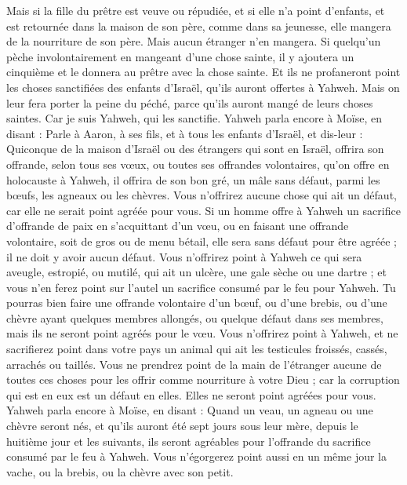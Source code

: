 \begin{multicols}{2}
Mais si la fille du prêtre est veuve ou répudiée, et si elle n'a point d'enfants, et est retournée dans la maison de son père, comme dans sa jeunesse, elle mangera de la nourriture de son père. Mais aucun étranger n'en mangera.
Si quelqu'un pèche involontairement en mangeant d'une chose sainte, il y ajoutera un cinquième et le donnera au prêtre avec la chose sainte.
Et ils ne profaneront point les choses sanctifiées des enfants d'Israël, qu'ils auront offertes à Yahweh.
Mais on leur fera porter la peine du péché, parce qu'ils auront mangé de leurs choses saintes. Car je suis Yahweh, qui les sanctifie.
Yahweh parla encore à Moïse, en disant :
Parle à Aaron, à ses fils, et à tous les enfants d'Israël, et dis-leur : Quiconque de la maison d'Israël ou des étrangers qui sont en Israël, offrira son offrande, selon tous ses vœux, ou toutes ses offrandes volontaires, qu'on offre en holocauste à Yahweh,
il offrira de son bon gré, un mâle sans défaut, parmi les bœufs, les agneaux ou les chèvres.
Vous n'offrirez aucune chose qui ait un défaut, car elle ne serait point agréée pour vous.
Si un homme offre à Yahweh un sacrifice d'offrande de paix en s'acquittant d'un vœu, ou en faisant une offrande volontaire, soit de gros ou de menu bétail, elle sera sans défaut pour être agréée ; il ne doit y avoir aucun défaut.
Vous n'offrirez point à Yahweh ce qui sera aveugle, estropié, ou mutilé, qui ait un ulcère, une gale sèche ou une dartre ; et vous n'en ferez point sur l'autel un sacrifice consumé par le feu pour Yahweh.
Tu pourras bien faire une offrande volontaire d'un bœuf, ou d'une brebis, ou d'une chèvre ayant quelques membres allongés, ou quelque défaut dans ses membres, mais ils ne seront point agréés pour le vœu.
Vous n'offrirez point à Yahweh, et ne sacrifierez point dans votre pays un animal qui ait les testicules froissés, cassés, arrachés ou taillés.
Vous ne prendrez point de la main de l'étranger aucune de toutes ces choses pour les offrir comme nourriture à votre Dieu ; car la corruption qui est en eux est un défaut en elles. Elles ne seront point agréées pour vous.
Yahweh parla encore à Moïse, en disant :
Quand un veau, un agneau ou une chèvre seront nés, et qu'ils auront été sept jours sous leur mère, depuis le huitième jour et les suivants, ils seront agréables pour l'offrande du sacrifice consumé par le feu à Yahweh.
Vous n'égorgerez point aussi en un même jour la vache, ou la brebis, ou la chèvre avec son petit.

\end{multicols}
